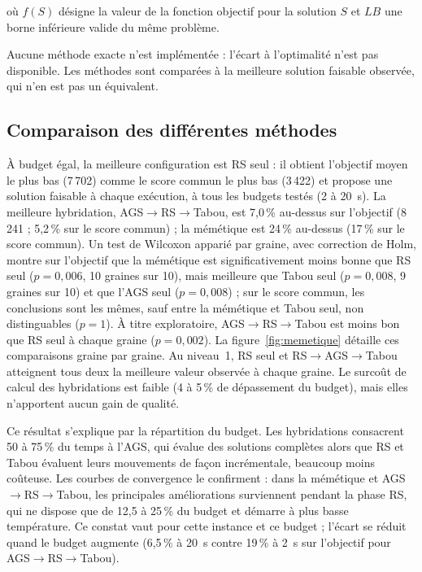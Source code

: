 \documentclass[11pt,a4paper]{article}
\begin{document}
où $f(S)$ désigne la valeur de la fonction
objectif pour la solution $S$ et $LB$
une borne inférieure valide du même problème.

Aucune méthode exacte n'est implémentée : l'écart à l'optimalité n'est pas disponible. Les méthodes sont comparées à la meilleure solution faisable observée, qui n'en est pas un équivalent.

\subsection{Comparaison des différentes méthodes}

À budget égal, la meilleure configuration est RS seul : il obtient l'objectif moyen le plus bas (7\,702) comme le score commun le plus bas (3\,422) et propose une solution faisable à chaque exécution, à tous les budgets testés (2 à 20~s). La meilleure hybridation, AGS$\rightarrow$RS$\rightarrow$Tabou, est 7,0\,\% au-dessus sur l'objectif (8\,241 ; 5,2\,\% sur le score commun) ; la mémétique est 24\,\% au-dessus (17\,\% sur le score commun). Un test de Wilcoxon apparié par graine, avec correction de Holm, montre sur l'objectif que la mémétique est significativement moins bonne que RS seul ($p=0{,}006$, 10 graines sur 10), mais meilleure que Tabou seul ($p=0{,}008$, 9 graines sur 10) et que l'AGS seul ($p=0{,}008$) ; sur le score commun, les conclusions sont les mêmes, sauf entre la mémétique et Tabou seul, non distinguables ($p=1$). À titre exploratoire, AGS$\rightarrow$RS$\rightarrow$Tabou est moins bon que RS seul à chaque graine ($p=0{,}002$). La figure~\ref{fig:memetique} détaille ces comparaisons graine par graine. Au niveau~1, RS seul et RS$\rightarrow$AGS$\rightarrow$Tabou atteignent tous deux la meilleure valeur observée à chaque graine. Le surcoût de calcul des hybridations est faible (4 à 5\,\% de dépassement du budget), mais elles n'apportent aucun gain de qualité.

Ce résultat s'explique par la répartition du budget. Les hybridations consacrent 50 à 75\,\% du temps à l'AGS, qui évalue des solutions complètes alors que RS et Tabou évaluent leurs mouvements de façon incrémentale, beaucoup moins coûteuse. Les courbes de convergence le confirment : dans la mémétique et AGS$\rightarrow$RS$\rightarrow$Tabou, les principales améliorations surviennent pendant la phase RS, qui ne dispose que de 12,5 à 25\,\% du budget et démarre à plus basse température. Ce constat vaut pour cette instance et ce budget ; l'écart se réduit quand le budget augmente (6,5\,\% à 20~s contre 19\,\% à 2~s sur l'objectif pour AGS$\rightarrow$RS$\rightarrow$Tabou).
\end{document}
